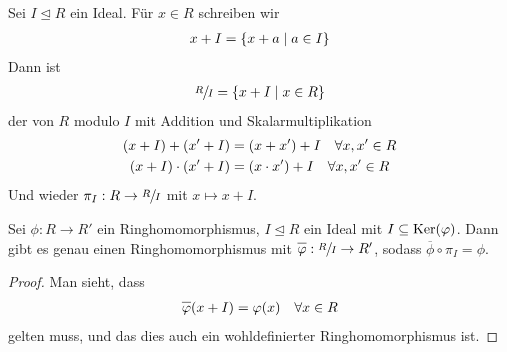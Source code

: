 \begin{definition}[Quotientenring]
	Sei $I\unlhd R$ ein Ideal. Für $x\in R$ schreiben wir 
	\begin{align}
		x+I=\{x+a\mid a\in I\}\notag
	\end{align}
	Dann ist
	\begin{align}
		\sfrac{R}{I}=\{x+I\mid x\in R\}\notag
	\end{align}
	der  von $R$ modulo $I$ mit Addition und Skalarmultiplikation
	\begin{align}
		(x+I)+(x'+I) &= (x+x')+I\quad\forall x,x'\in R \notag \\
		(x+I)\cdot (x'+I) &= (x\cdot x')+I\quad\forall x,x'\in R\notag
	\end{align}
	Und wieder $\pi_I:R\to\sfrac{R}{I}$ mit $x\mapsto x+I$.
\end{definition}

\begin{proposition}
	Sei $\phi:R\to R'$ ein Ringhomomorphismus, $I\unlhd R$ ein Ideal mit $I\subseteq \operatorname{Ker}(\varphi)$. Dann gibt es genau einen Ringhomomorphismus mit $\overline{\phi}:\qraum{R}{I}\to R'$, sodass $\overline{\phi}\circ \pi_I=\phi$.
	\begin{center}
	\end{center}
\end{proposition}
\begin{proof}
	Man sieht, dass 
	\begin{align}
		\overline{\phi}(x+I)=\phi(x)\quad\forall x\in R\notag
	\end{align}
	gelten muss, und das dies auch ein wohldefinierter Ringhomomorphismus ist.
\end{proof}